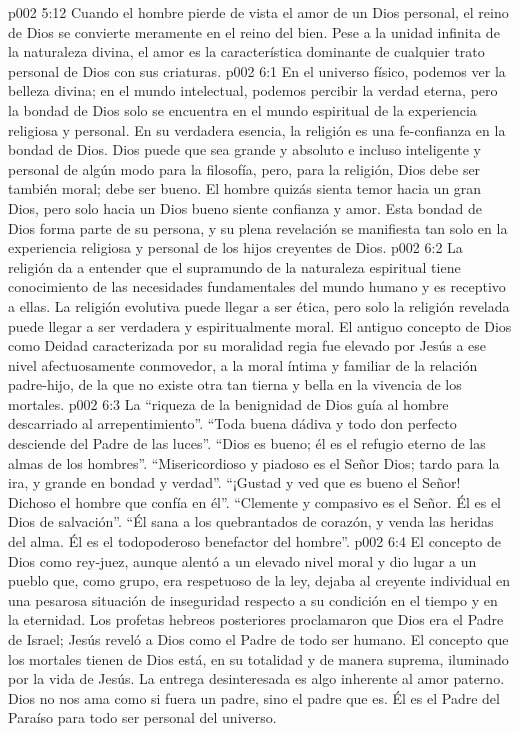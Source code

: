 \vs p002 5:12 \pc Cuando el hombre pierde de vista el amor de un Dios personal, el reino de Dios se convierte meramente en el reino del bien. Pese a la unidad infinita de la naturaleza divina, el amor es la característica dominante de cualquier trato personal de Dios con sus criaturas.
\vs p002 6:1 En el universo físico, podemos ver la belleza divina; en el mundo intelectual, podemos percibir la verdad eterna, pero la bondad de Dios solo se encuentra en el mundo espiritual de la experiencia religiosa y personal. En su verdadera esencia, la religión es una fe\hyp{}confianza en la bondad de Dios. Dios puede que sea grande y absoluto e incluso inteligente y personal de algún modo para la filosofía, pero, para la religión, Dios debe ser también moral; debe ser bueno. El hombre quizás sienta temor hacia un gran Dios, pero solo hacia un Dios bueno siente confianza y amor. Esta bondad de Dios forma parte de su persona, y su plena revelación se manifiesta tan solo en la experiencia religiosa y personal de los hijos creyentes de Dios.
\vs p002 6:2 La religión da a entender que el supramundo de la naturaleza espiritual tiene conocimiento de las necesidades fundamentales del mundo humano y es receptivo a ellas. La religión evolutiva puede llegar a ser ética, pero solo la religión revelada puede llegar a ser verdadera y espiritualmente moral. El antiguo concepto de Dios como Deidad caracterizada por su moralidad regia fue elevado por Jesús a ese nivel afectuosamente conmovedor, a la moral íntima y familiar de la relación padre\hyp{}hijo, de la que no existe otra tan tierna y bella en la vivencia de los mortales.
\vs p002 6:3 \pc La “riqueza de la benignidad de Dios guía al hombre descarriado al arrepentimiento”. “Toda buena dádiva y todo don perfecto desciende del Padre de las luces”. “Dios es bueno; él es el refugio eterno de las almas de los hombres”. “Misericordioso y piadoso es el Señor Dios; tardo para la ira, y grande en bondad y verdad”. “¡Gustad y ved que es bueno el Señor! Dichoso el hombre que confía en él”. “Clemente y compasivo es el Señor. Él es el Dios de salvación”. “Él sana a los quebrantados de corazón, y venda las heridas del alma. Él es el todopoderoso benefactor del hombre”.
\vs p002 6:4 \pc El concepto de Dios como rey\hyp{}juez, aunque alentó a un elevado nivel moral y dio lugar a un pueblo que, como grupo, era respetuoso de la ley, dejaba al creyente individual en una pesarosa situación de inseguridad respecto a su condición en el tiempo y en la eternidad. Los profetas hebreos posteriores proclamaron que Dios era el Padre de Israel; Jesús reveló a Dios como el Padre de todo ser humano. El concepto que los mortales tienen de Dios está, en su totalidad y de manera suprema, iluminado por la vida de Jesús. La entrega desinteresada es algo inherente al amor paterno. Dios no nos ama como si fuera un padre, sino  el padre que es. Él es el Padre del Paraíso para todo ser personal del universo.
